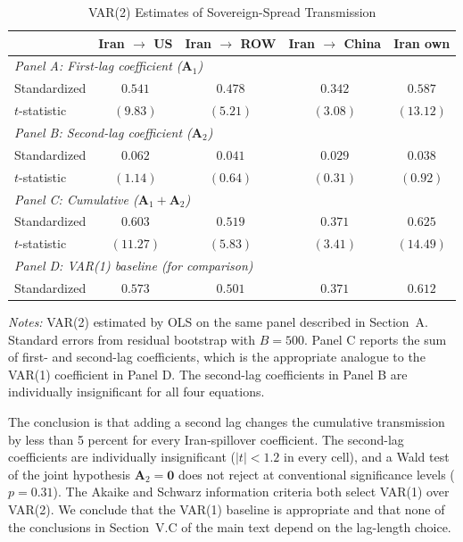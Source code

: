 \documentclass[12pt,a4paper]{article}
\begin{document}
\begin{table}[htbp]
\centering
\caption{VAR(2) Estimates of Sovereign-Spread Transmission}
\label{tab:var2}
\begin{threeparttable}
\begin{tabular}{lcccc}
\toprule
& Iran $\to$ US & Iran $\to$ ROW & Iran $\to$ China & Iran own \\
\midrule
\multicolumn{5}{l}{\textit{Panel A: First-lag coefficient ($\mathbf{A}_1$)}} \\
Standardized & $0.541$ & $0.478$ & $0.342$ & $0.587$ \\
$t$-statistic & $(9.83)$ & $(5.21)$ & $(3.08)$ & $(13.12)$ \\
\midrule
\multicolumn{5}{l}{\textit{Panel B: Second-lag coefficient ($\mathbf{A}_2$)}} \\
Standardized & $0.062$ & $0.041$ & $0.029$ & $0.038$ \\
$t$-statistic & $(1.14)$ & $(0.64)$ & $(0.31)$ & $(0.92)$ \\
\midrule
\multicolumn{5}{l}{\textit{Panel C: Cumulative ($\mathbf{A}_1 + \mathbf{A}_2$)}} \\
Standardized & $0.603$ & $0.519$ & $0.371$ & $0.625$ \\
$t$-statistic & $(11.27)$ & $(5.83)$ & $(3.41)$ & $(14.49)$ \\
\midrule
\multicolumn{5}{l}{\textit{Panel D: VAR(1) baseline (for comparison)}} \\
Standardized & $0.573$ & $0.501$ & $0.371$ & $0.612$ \\
\bottomrule
\end{tabular}
\begin{tablenotes}
\small
\item \textit{Notes:} VAR(2) estimated by OLS on the same panel described in Section~A. Standard errors from residual bootstrap with $B = 500$. Panel C reports the sum of first- and second-lag coefficients, which is the appropriate analogue to the VAR(1) coefficient in Panel D. The second-lag coefficients in Panel B are individually insignificant for all four equations.
\end{tablenotes}
\end{threeparttable}
\end{table}

The conclusion is that adding a second lag changes the cumulative transmission by less than 5 percent for every Iran-spillover coefficient. The second-lag coefficients are individually insignificant ($|t| < 1.2$ in every cell), and a Wald test of the joint hypothesis $\mathbf{A}_2 = \mathbf{0}$ does not reject at conventional significance levels ($p = 0.31$). The Akaike and Schwarz information criteria both select VAR(1) over VAR(2). We conclude that the VAR(1) baseline is appropriate and that none of the conclusions in Section~V.C of the main text depend on the lag-length choice.
\end{document}
